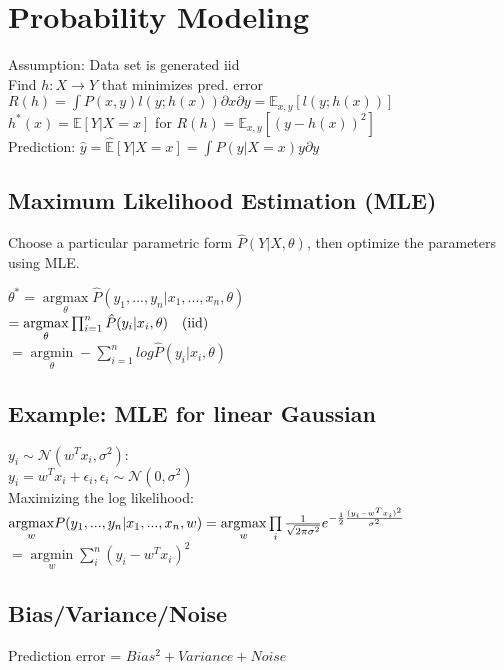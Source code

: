 \section*{Probability Modeling}
Assumption: Data set is generated iid\\
Find $h:X\rightarrow Y$ that minimizes pred. error $R(h) = \int P(x,y)l(y;h(x)) \partial x \partial y = \mathbb{E}_{x,y}[l(y;h(x))]$\\
$h^*(x) = \mathbb{E}[Y|X=x]$ for $R(h) = \mathbb{E}_{x,y}[(y-h(x))^2]$\\
Prediction: $\hat{y} = \hat{\mathbb{E}}[Y|X=x] = \int \hat{P}(y|X=x)y\partial y$

\subsection*{Maximum Likelihood Estimation (MLE)}
Choose a particular parametric form $\hat{P}(Y|X,\theta)$, then optimize the parameters using MLE.

$\theta^* = \underset{\theta}{\operatorname{argmax}} \hat{P}(y_1,...,y_n|x_1,...,x_n,\theta) $\\
$= \underset{\theta}{\operatorname{argmax}} \prod_{i=1}^n \hat{P}(y_i|x_i, \theta) \text{\quad (iid)}$\\
$= \underset{\theta}{\operatorname{argmin}} - \sum_{i=1}^n log \hat{P}(y_i|x_i,\theta)$\\

\subsection*{Example: MLE for linear Gaussian}
$y_i \sim \mathcal{N} (w^T x_i, \sigma^2):$\\
$y_i = w^T x_i + \epsilon_i, \epsilon_i \sim \mathcal{N}(0, \sigma^2)$\\
Maximizing the log likelihood:\\
$\underset{w}{\operatorname{argmax}} P(y_1,...,y_n|x_1,...,x_n,w)\\
= \underset{w}{\operatorname{argmax}} \prod \limits_i \frac{1}{\sqrt{2\pi\sigma^2}} e^{-\frac{1}{2} \frac{(y_i-w^T x_i)^2}{\sigma^2}}$\\
$= \underset{w}{\operatorname{argmin}}  \sum_i^n (y_i-w^Tx_i)^2$

\subsection*{Bias/Variance/Noise}
Prediction error = $Bias^2 + Variance + Noise$

